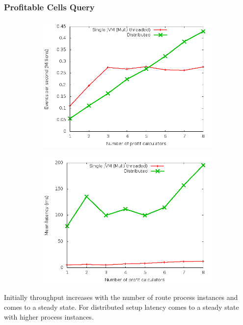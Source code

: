 \documentclass{beamer}
\begin{document}
\begin{frame}
\frametitle{Profitable Cells Query}

\begin{figure}
        \centering
        \begin{subfigure}[b]{0.45\textwidth}
                \includegraphics[width=\textwidth]{throughput_profit.png}
        \end{subfigure}
        \begin{subfigure}[b]{0.45\textwidth}
                \includegraphics[width=\textwidth]{latency_profit.png}
        \end{subfigure}
\end{figure}

\footnotesize Initially throughput increases with the number of route process instances and comes to a steady state. For distributed setup latency comes to a steady state with higher process instances.

\end{frame}
\end{document}
